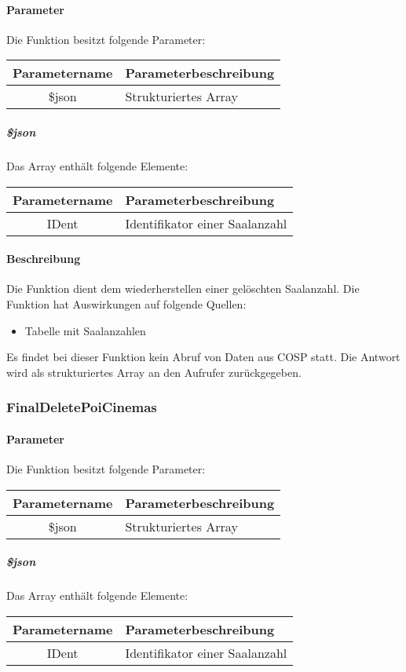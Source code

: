 \paragraph{Parameter} Die Funktion besitzt folgende Parameter:
\begin{table}[H]
	\begin{tabular}{|c|p{11cm}|}
		\hline
		\textbf{Parametername} & \textbf{Parameterbeschreibung} \\ \hline
		\$json & Strukturiertes Array \\ \hline
	\end{tabular}
\end{table}
\subparagraph{\$json}Das Array enthält folgende Elemente:
\begin{table}[H]
	\begin{tabular}{|c|p{11cm}|}
		\hline
		\textbf{Parametername} & \textbf{Parameterbeschreibung} \\ \hline
		IDent & Identifikator einer Saalanzahl \\ \hline
	\end{tabular}
\end{table}
\paragraph{Beschreibung} Die Funktion dient dem wiederherstellen einer gelöschten Saalanzahl. Die Funktion hat Auswirkungen auf folgende Quellen:
\begin{itemize}
	\item Tabelle mit Saalanzahlen
\end{itemize}
Es findet bei dieser Funktion kein Abruf von Daten aus {\glqq COSP\grqq} statt. Die Antwort wird als strukturiertes Array an den Aufrufer zurückgegeben.
\subsubsection{FinalDeletePoiCinemas}
\paragraph{Parameter} Die Funktion besitzt folgende Parameter:
\begin{table}[H]
	\begin{tabular}{|c|p{11cm}|}
		\hline
		\textbf{Parametername} & \textbf{Parameterbeschreibung} \\ \hline
		\$json & Strukturiertes Array \\ \hline
	\end{tabular}
\end{table}
\subparagraph{\$json}Das Array enthält folgende Elemente:
\begin{table}[H]
	\begin{tabular}{|c|p{11cm}|}
		\hline
		\textbf{Parametername} & \textbf{Parameterbeschreibung} \\ \hline
		IDent & Identifikator einer Saalanzahl \\ \hline
	\end{tabular}
\end{table}
